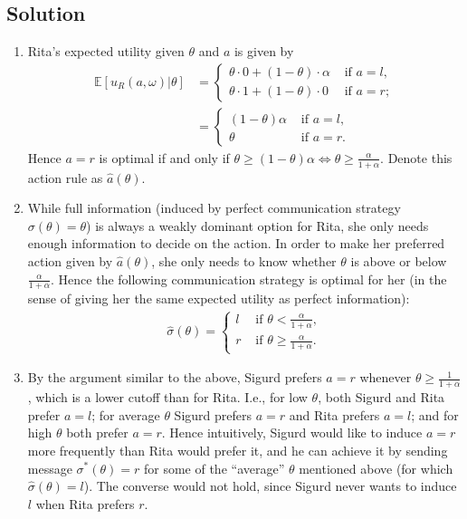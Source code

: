 \documentclass[a4paper]{article}
\newif\ifsolutions
\begin{document}
\ifsolutions
\subsection*{Solution}

\begin{enumerate}
	\item Rita's expected utility given $\theta$ and $a$ is given by
	\begin{align*}
		\mathbb{E}[u_R(a,\omega)|\theta] &= \begin{cases}
			\theta \cdot 0 + (1-\theta) \cdot \alpha & \text{ if } a=l, \\
			\theta \cdot 1 + (1-\theta) \cdot 0 & \text{ if } a=r;
		\end{cases}
		\\
		&= \begin{cases}
			(1-\theta) \alpha & \text{ if } a=l, \\
			\theta & \text{ if } a=r.
		\end{cases}
	\end{align*}
	Hence $a=r$ is optimal if and only if $\theta \geq (1-\theta) \alpha \iff \theta \geq \frac{\alpha}{1+\alpha}$. Denote this action rule as $\hat{a}(\theta)$.
	
	\item While full information (induced by perfect communication strategy $\sigma(\theta)=\theta$) is always a weakly dominant option for Rita, she only needs enough information to decide on the action. In order to make her preferred action given by $\hat{a}(\theta)$, she only needs to know whether $\theta$ is above or below $\frac{\alpha}{1+\alpha}$. Hence the following communication strategy is optimal for her (in the sense of giving her the same expected utility as perfect information):
	\begin{align*}
		\hat{\sigma}(\theta) = \begin{cases}
			l & \text{ if } \theta < \frac{\alpha}{1+\alpha},
			\\
			r & \text{ if } \theta \geq \frac{\alpha}{1+\alpha}.
		\end{cases}
	\end{align*}
	
	\item By the argument similar to the above, Sigurd prefers $a=r$ whenever $\theta \geq \frac{1}{1+\alpha}$, which is a lower cutoff than for Rita. I.e., for low $\theta$, both Sigurd and Rita prefer $a=l$; for average $\theta$ Sigurd prefers $a=r$ and Rita prefers $a=l$; and for high $\theta$ both prefer $a=r$. Hence intuitively, Sigurd would like to induce $a=r$ more frequently than Rita would prefer it, and he can achieve it by sending message $\sigma^*(\theta)=r$ for some of the ``average'' $\theta$ mentioned above (for which $\hat{\sigma}(\theta)=l$). The converse would not hold, since Sigurd never wants to induce $l$ when Rita prefers $r$.
	

\end{enumerate}
\end{document}
